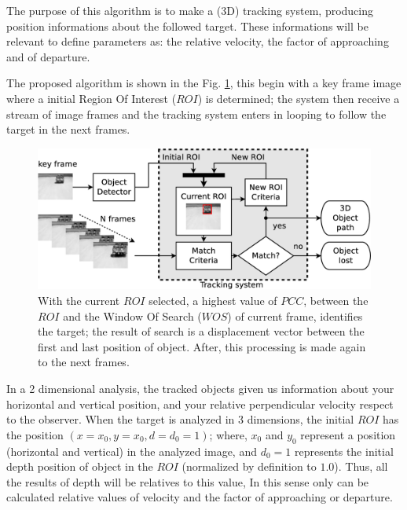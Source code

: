 The purpose of this algorithm is to make a (3D) tracking system, producing position informations 
about the followed target.
These informations will be relevant to define parameters 
as: the relative velocity, the factor of approaching and of departure.

The proposed algorithm is shown in the Fig. \ref{fig:system}, 
this begin with a key frame image where a initial Region Of Interest ($ROI$) is determined; 
the system then receive a stream of image frames and the tracking system 
enters in looping to follow the target in the next frames.


\begin{figure}[bhp]
\includegraphics[width=\columnwidth]{images/figure1-diagram1.eps}
\caption{With the current $ROI$ selected, a highest value of $PCC$, between the $ROI$ 
and the Window Of Search ($WOS$) of current frame, identifies the target; 
the result of search is a displacement vector
between the first and last position of object. 
After, this processing is made again to the next frames.}
\label{fig:system}
\end{figure}

In a 2 dimensional analysis, the tracked objects given us information about your horizontal 
and vertical position, and your relative perpendicular velocity respect to the observer.
When the target is analyzed in 3 dimensions, 
the initial $ROI$ has the position $(x=x_0,y=x_0,d=d_0=1)$;
where, $x_0$ and $y_0$ represent a position (horizontal and vertical) in the analyzed image,
and $d_0=1$ represents the initial depth position of object in the $ROI$ (normalized by definition to $1.0$).
Thus, all the results of depth will be relatives to this value, 
In this sense only can be calculated relative values of
velocity and the factor of approaching or departure. 

